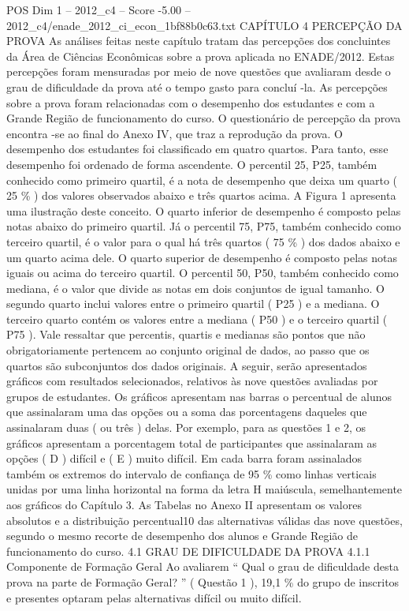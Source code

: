 \begin{textsample}{POS Dim 1 – 2012\_c4 – Score -5.00 – 2012\_c4/enade\_2012\_ci\_econ\_1bf88b0c63.txt}  \label{ex:f1_pos_370}
CAPÍTULO 4 PERCEPÇÃO DA PROVA As análises feitas neste capítulo tratam das percepções dos concluintes da Área de Ciências Econômicas sobre a prova aplicada no ENADE/2012.
Estas percepções foram mensuradas por meio de nove questões que avaliaram desde o grau de dificuldade da prova até o tempo gasto para concluí -la.
As percepções sobre a prova foram relacionadas com o desempenho dos estudantes e com a Grande Região de funcionamento do curso.
O questionário de percepção da prova encontra -se ao final do Anexo IV, que traz a reprodução da prova.
O desempenho dos estudantes foi classificado em quatro quartos.
Para tanto, esse desempenho foi ordenado de forma ascendente.
O percentil 25, P25, também conhecido como primeiro quartil, é a nota de desempenho que deixa um quarto ( 25 \% ) dos valores observados abaixo e três quartos acima.
A Figura 1 apresenta uma ilustração deste conceito.
O quarto inferior de desempenho é composto pelas notas abaixo do primeiro quartil.
Já o percentil 75, P75, também conhecido como terceiro quartil, é o valor para o qual há três quartos ( 75 \% ) dos dados abaixo e um quarto acima dele.
O quarto superior de desempenho é composto pelas notas iguais ou acima do terceiro quartil.
O percentil 50, P50, também conhecido como mediana, é o valor que divide as notas em dois conjuntos de igual tamanho.
O segundo quarto inclui valores entre o primeiro quartil ( P25 ) e a mediana.
O terceiro quarto contém os valores entre a mediana ( P50 ) e o terceiro quartil ( P75 ).
Vale ressaltar que percentis, quartis e medianas são pontos que não obrigatoriamente pertencem ao conjunto original de dados, ao passo que os quartos são subconjuntos dos dados originais.
A seguir, serão apresentados gráficos com resultados selecionados, relativos às nove questões avaliadas por grupos de estudantes.
Os gráficos apresentam nas barras o percentual de alunos que assinalaram uma das opções ou a soma das porcentagens daqueles que assinalaram duas ( ou três ) delas.
Por exemplo, para as questões 1 e 2, os gráficos apresentam a porcentagem total de participantes que assinalaram as opções ( D ) difícil e ( E ) muito difícil.
Em cada barra foram assinalados também os extremos do intervalo de confiança de 95 \% como linhas verticais unidas por uma linha horizontal na forma da letra H maiúscula, semelhantemente aos gráficos do Capítulo 3.
As Tabelas no Anexo II apresentam os valores absolutos e a distribuição percentual10 das alternativas válidas das nove questões, segundo o mesmo recorte de desempenho dos alunos e Grande Região de funcionamento do curso. 4.1 GRAU DE DIFICULDADE DA PROVA 4.1.1 Componente de Formação Geral Ao avaliarem “ Qual o grau de dificuldade desta prova na parte de Formação Geral? ” ( Questão 1 ), 19,1 \% do grupo de inscritos e presentes optaram pelas alternativas difícil ou muito difícil.

\end{textsample}
